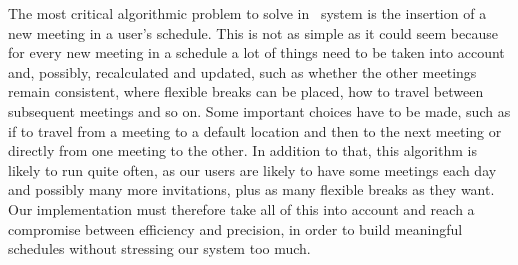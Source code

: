 The most critical algorithmic problem to solve in \projectname~system is the insertion of a new meeting in a user's schedule. This is not as simple as it could seem because for every new meeting in a schedule a lot of things need to be taken into account and, possibly, recalculated and updated, such as whether the other meetings remain consistent, where flexible breaks can be placed, how to travel between subsequent meetings and so on. Some important choices have to be made, such as if to travel from a meeting to a default location and then to the next meeting or directly from one meeting to the other. In addition to that, this algorithm is likely to run quite often, as our users are likely to have some meetings each day and possibly many more invitations, plus as many flexible breaks as they want. Our implementation must therefore take all of this into account and reach a compromise between efficiency and precision, in order to build meaningful schedules without stressing our system too much.